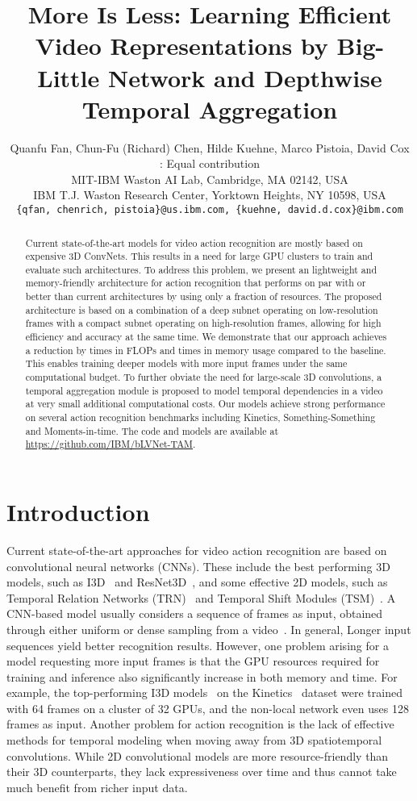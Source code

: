 \documentclass{article}
\title{More Is Less: Learning Efficient Video Representations by Big-Little Network and Depthwise Temporal Aggregation}
\author{Quanfu Fan, Chun-Fu (Richard) Chen, Hilde Kuehne, Marco Pistoia, David Cox \\
    : Equal contribution \\
    MIT-IBM Waston AI Lab, Cambridge, MA 02142, USA\\
    IBM T.J. Waston Research Center, Yorktown Heights, NY 10598, USA\\
    \texttt{\{qfan, chenrich, pistoia\}@us.ibm.com, \{kuehne, david.d.cox\}@ibm.com}\\
}
\begin{document}
\maketitle

\begin{abstract}
Current state-of-the-art models for video action recognition are mostly based on expensive 3D ConvNets. This results in a need for large GPU clusters to train and evaluate such architectures.
To address this problem, we present an lightweight and memory-friendly architecture for action recognition that performs on par with or better than current architectures by using only a fraction of resources.
The proposed architecture is based on a combination of a deep subnet operating on low-resolution frames with a compact subnet operating on high-resolution frames, allowing for high efficiency and accuracy at the same time. We demonstrate that our approach achieves a reduction by  times in FLOPs and  times in memory usage compared to the baseline. This enables training deeper models with more input frames under the same computational budget.  To further obviate the need for large-scale 3D convolutions, a temporal aggregation module is proposed to model temporal dependencies in a video at very small additional computational costs. 
Our models achieve strong performance on several action recognition benchmarks including Kinetics, Something-Something and Moments-in-time. The code and models are available at \url{https://github.com/IBM/bLVNet-TAM}.
\end{abstract}


\section{Introduction}
\label{sec:introduction}


Current state-of-the-art approaches for video action recognition are based on convolutional neural networks (CNNs).  These include the best performing 3D models, such as I3D~\cite{I3D:carreira2017quo} and ResNet3D~\cite{ResNet3D:hara2017learning}, and some effective 2D models, such as Temporal Relation Networks (TRN)~\cite{TRN:zhou2018temporal} and Temporal Shift Modules (TSM)~\cite{TSM:lin2018temporal}. A CNN-based model usually considers a sequence of frames as input, obtained through either uniform or dense sampling from a video~\cite{I3D:carreira2017quo, TSN:wang2016temporal}. In general, Longer input sequences yield better recognition results. However, one problem arising for a model requesting more input frames is that the GPU resources required for training and inference also significantly increase in both memory and time.
For example, the top-performing I3D models~\cite{I3D:carreira2017quo} on the Kinetics~\cite{Kinetics:kay2017kinetics} dataset were trained with 64 frames on a cluster of 32 GPUs, and the non-local network \cite{Wang2018NonLocal} even uses 128 frames as input. 
Another problem for action recognition is the lack of effective methods for temporal modeling when moving away from 3D spatiotemporal convolutions.
While 2D convolutional models are more resource-friendly than their 3D counterparts, they lack expressiveness over time and thus cannot take much benefit from richer input data.
\end{document}
